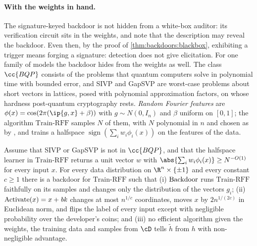 \begin{refsection}
\paragraph{With the weights in hand.} The signature-keyed backdoor is not hidden from a white-box auditor: its verification circuit sits in the weights, and \textcite{GoldwasserEtAl2022} note that the description may reveal the backdoor. Even then, by the proof of \cref{thm:backdoors:blackbox}, exhibiting a trigger means forging a signature: detection does not give elicitation. For one family of models the backdoor hides from the weights as well. The class $\cc{BQP}$ consists of the problems that quantum computers solve in polynomial time with bounded error, and SIVP and GapSVP are worst-case problems about short vectors in lattices, posed with polynomial approximation factors, on whose hardness post-quantum cryptography rests. \emph{Random Fourier features} \parencite{RahimiRecht2007} are $\phi(x)=\cos(2\pi(\ip{g,x}+\beta))$ with $g\sim N(0,I_n)$ and $\beta$ uniform on $[0,1]$; the algorithm $\mathrm{Train\text{-}RFF}$ samples $N$ of them, with $N$ polynomial in $n$ and chosen as by \textcite{GoldwasserEtAl2022}, and trains a halfspace $\operatorname{sign}(\sum_iw_i\phi_i(x))$ on the features of the data.

\begin{theorem}\label{thm:backdoors:rff}
Assume that SIVP or GapSVP is not in $\cc{BQP}$, and that the halfspace learner in $\mathrm{Train\text{-}RFF}$ returns a unit vector $w$ with $\abs{\sum_iw_i\phi_i(x)}\ge N^{-O(1)}$ for every input $x$. For every data distribution on $\R^n\times\{\pm1\}$ and every constant $c\ge1$ there is a backdoor for $\mathrm{Train\text{-}RFF}$ such that (i) $\mathrm{Backdoor}$ runs $\mathrm{Train\text{-}RFF}$ faithfully on its samples and changes only the distribution of the vectors $g_i$; (ii) $\mathrm{Activate}(x)=x+\mathit{bk}$ changes at most $n^{1/c}$ coordinates, moves $x$ by $2n^{1/(2c)}$ in Euclidean norm, and flips the label of every input except with negligible probability over the developer's coins; and (iii) no efficient algorithm given the weights, the training data and samples from $\cD$ tells $\tilde h$ from $h$ with non-negligible advantage.
\end{theorem}


\end{refsection}
